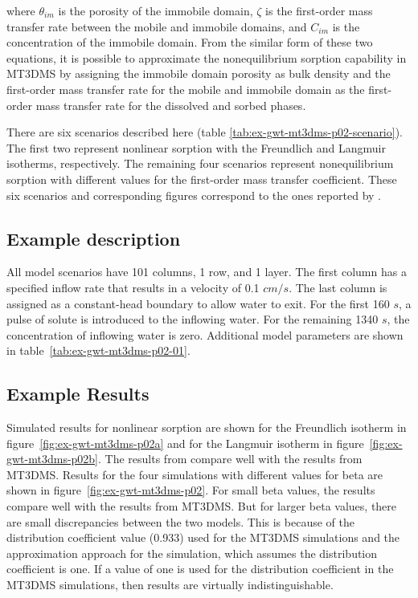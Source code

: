 \noindent where $\theta_{im}$ is the porosity of the immobile domain, $\zeta$ is the first-order mass transfer rate between the mobile and immobile domains, and $C_{im}$ is the concentration of the immobile domain.  From the similar form of these two equations, it is possible to approximate the nonequilibrium sorption capability in MT3DMS by assigning the immobile domain porosity as bulk density and the first-order mass transfer rate for the mobile and immobile domain as the first-order mass transfer rate for the dissolved and sorbed phases.

There are six scenarios described here (table \ref{tab:ex-gwt-mt3dms-p02-scenario}).  The first two represent nonlinear sorption with the Freundlich and Langmuir isotherms, respectively.  The remaining four scenarios represent nonequilibrium sorption with different values for the first-order mass transfer coefficient.  These six scenarios and corresponding figures correspond to the ones reported by \cite{zheng1999mt3dms}.



\subsection{Example description}

All model scenarios have 101 columns, 1 row, and 1 layer. The first column has a specified inflow rate that results in a velocity of 0.1 $cm/s$. The last column is assigned as a constant-head boundary to allow water to exit.  For the first 160 $s$, a pulse of solute is introduced to the inflowing water.  For the remaining 1340 $s$, the concentration of inflowing water is zero.  Additional model parameters are shown in table~\ref{tab:ex-gwt-mt3dms-p02-01}.



\subsection{Example Results}
Simulated results for nonlinear sorption are shown for the Freundlich isotherm in figure~\ref{fig:ex-gwt-mt3dms-p02a} and for the Langmuir isotherm in figure~\ref{fig:ex-gwt-mt3dms-p02b}.  The results from \mf compare well with the results from MT3DMS.  Results for the four simulations with different values for beta are shown in figure~\ref{fig:ex-gwt-mt3dms-p02}.  For small beta values, the \mf results compare well with the results from MT3DMS.  But for larger beta values, there are small discrepancies between the two models.  This is because of the distribution coefficient value (0.933) used for the MT3DMS simulations and the approximation approach for the \mf simulation, which assumes the distribution coefficient is one.  If a value of one is used for the distribution coefficient in the MT3DMS simulations, then results are virtually indistinguishable.


